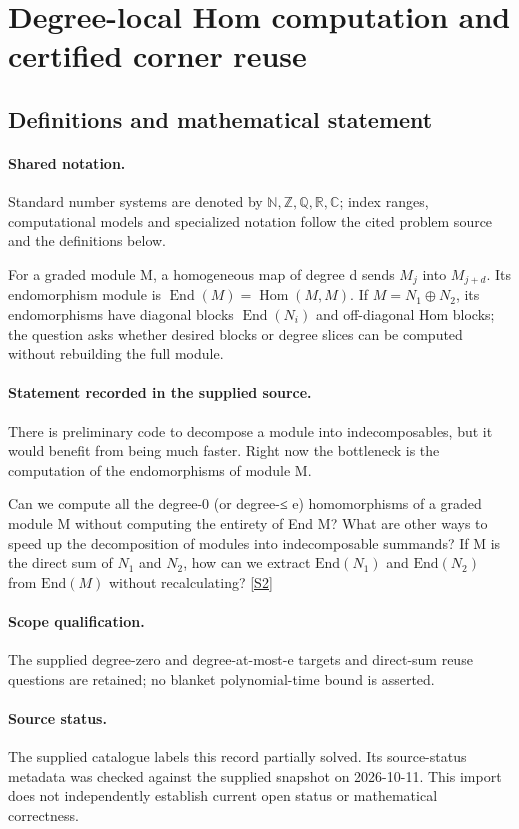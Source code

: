 \documentclass[11pt]{article}
\newcommand{\sref}[2]{\hyperlink{source:#1:#2}{[S#2]}}
\begin{document}
\section{Degree-local Hom computation and certified corner reuse}\label{statement}

\subsection{Definitions and mathematical statement}

\paragraph{Shared notation.}Standard number systems are denoted by $\mathbb N,\mathbb Z,\mathbb Q,\mathbb R,\mathbb C$; index ranges, computational models and specialized notation follow the cited problem source and the definitions below.


For a graded module M, a homogeneous map of degree d sends $M_j$ into $M_{j+d}$. Its endomorphism module is $\operatorname{End}(M)=\operatorname{Hom}(M,M)$. If $M=N_1\oplus N_2$, its endomorphisms have diagonal blocks $\operatorname{End}(N_i)$ and off-diagonal Hom blocks; the question asks whether desired blocks or degree slices can be computed without rebuilding the full module.
\paragraph{Statement recorded in the supplied source.}
There is preliminary code to decompose a module into indecomposables, but it would benefit from being much faster. Right now the bottleneck is the computation of the endomorphisms of module M.

Can we compute all the degree-0 (or degree-≤ e) homomorphisms of a graded module M without computing the entirety of End M? What are other ways to speed up the decomposition of modules into indecomposable summands? If M is the direct sum of $N_1$ and $N_2$, how can we extract $\mathrm{End}(N_1)$ and $\mathrm{End}(N_2)$ from $\mathrm{End}(M)$ without recalculating? \sref{statement}{2}
\paragraph{Scope qualification.}
The supplied degree-zero and degree-at-most-e targets and direct-sum reuse questions are retained; no blanket polynomial-time bound is asserted.
\paragraph{Source status.}
The supplied catalogue labels this record partially solved. Its source-status metadata was checked against the supplied snapshot on 2026-10-11. This import does not independently establish current open status or mathematical correctness.
\end{document}
